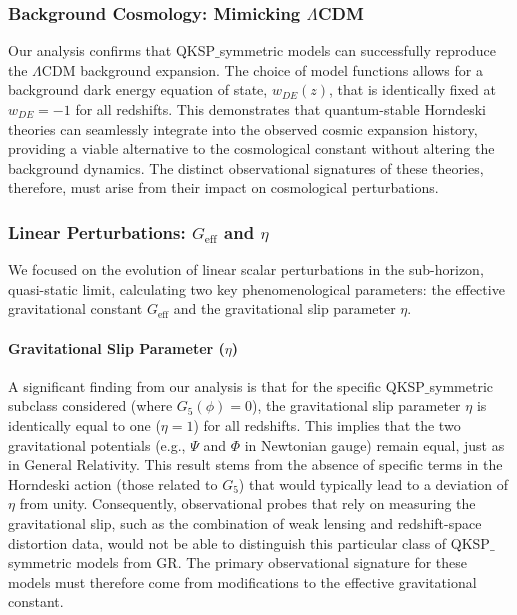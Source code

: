 \documentclass[twocolumn]{aastex631}
\begin{document}
\subsubsection{Background Cosmology: Mimicking $\Lambda$CDM}
Our analysis confirms that QKSP\ensuremath{\_}symmetric models can successfully reproduce the $\Lambda$CDM background expansion. The choice of model functions allows for a background dark energy equation of state, $w_{DE}(z)$, that is identically fixed at $w_{DE}=-1$ for all redshifts. This demonstrates that quantum-stable Horndeski theories can seamlessly integrate into the observed cosmic expansion history, providing a viable alternative to the cosmological constant without altering the background dynamics. The distinct observational signatures of these theories, therefore, must arise from their impact on cosmological perturbations.

\subsubsection{Linear Perturbations: $G_{\text{eff}}$ and $\eta$}
We focused on the evolution of linear scalar perturbations in the sub-horizon, quasi-static limit, calculating two key phenomenological parameters: the effective gravitational constant $G_{\text{eff}}$ and the gravitational slip parameter $\eta$.

\paragraph{Gravitational Slip Parameter ($\eta$)}
A significant finding from our analysis is that for the specific QKSP\ensuremath{\_}symmetric subclass considered (where $G_5(\phi)=0$), the gravitational slip parameter $\eta$ is identically equal to one ($\eta=1$) for all redshifts. This implies that the two gravitational potentials (e.g., $\Psi$ and $\Phi$ in Newtonian gauge) remain equal, just as in General Relativity. This result stems from the absence of specific terms in the Horndeski action (those related to $G_5$) that would typically lead to a deviation of $\eta$ from unity. Consequently, observational probes that rely on measuring the gravitational slip, such as the combination of weak lensing and redshift-space distortion data, would not be able to distinguish this particular class of QKSP\ensuremath{\_}symmetric models from GR. The primary observational signature for these models must therefore come from modifications to the effective gravitational constant.
\end{document}
